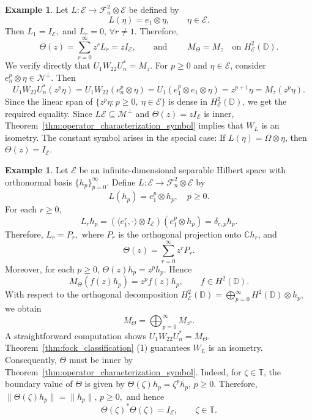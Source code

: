 \documentclass[12pt]{amsart}
\theoremstyle{definition}
\newtheorem{example}[theorem]{Example}
\theoremstyle{remark}
\def \D{\mathbb{D}}
\def \C{\mathbb{C}}
\def \T{\mathbb{T}}
\newcommand{\cle}{\mathcal{E}}
\newcommand{\clm}{\mathcal{M}}
\newcommand{\cln}{\mathcal{N}}
\newcommand{\clf}{\mathcal{F}}
\numberwithin{equation}{section}
\begin{document}
\begin{example} \label{ex:toeplitz symbol is M_z}
Let
$L:\cle\to \clf_n^2\otimes \cle$ be defined by
\[
L(\eta)=e_1\otimes \eta,
\qquad \eta\in \cle.
\]
Then 
$L_1 = I_\cle,$ and $L_r = 0, \, \forall r \neq 1.$ 
Therefore,
\[
\Theta(z)
=
\sum_{r=0}^{\infty} z^r L_r
=
z I_{\cle},
\qquad
\text{and }
\qquad
M_{\Theta}=M_z
\quad \text{on } H^2_{\cle}(\D).
\]
We verify directly that $U_1 W_{22} U_n^*=M_{z}.$ For $p \geq 0$ and $\eta \in \cle$, consider $e_n^{p} \otimes \eta \in \cln^\perp$. Then 
\[
U_1 W_{22} U_n^*(z^p \eta) = U_1 W_{22} (e_n^{p} \otimes \eta) = U_1 (e_1^{p} \otimes e_1 \otimes \eta) = z^{p+1} \eta=M_z (z^p \eta).
\]
Since the linear span of \(\{z^p\eta:p\geq0,\ \eta\in\cle\}\) is dense in $H^2_\cle(\D)$,
we get the required equality. Since \(L\cle\subseteq\clm^\perp\) and \(\Theta(z)=zI_\cle\) is inner,
Theorem~\ref{thm:operator_characterization_symbol} implies that \(W_L\) is an
isometry.
The constant symbol arises in the special case: If $L(\eta)=\Omega\otimes\eta$, then $\Theta(z)=I_\cle.$
\end{example}

\begin{example}
Let $\cle$ be an infinite-dimensional separable Hilbert space with orthonormal basis
$\{h_p\}_{p=0}^\infty$.
Define $L:\cle\to \clf_n^2\otimes \cle$ by
\[
L(h_p)=e_1^{ p}\otimes h_p,
\quad p\ge 0.
\]
For each $r\ge 0$, 
\[
L_r h_p
=
(\langle e_1^{r},\cdot\rangle\otimes I_{\cle})
(e_1^{p}\otimes h_p)
=
\delta_{r,p}h_p.
\]
Therefore, $ L_r=P_r,$
where $P_r$ is the orthogonal projection onto $\C h_r$, and $$\Theta(z)=\sum_{r=0}^\infty z^rP_r.$$
Moreover, for each $p\ge 0$, $\Theta(z)h_p=z^p h_p.$
Hence
\[
M_\Theta(f(z)h_p)=z^p f(z)h_p,
\qquad f\in H^2(\D).
\]
With respect to the orthogonal decomposition $H^2_{\cle}(\D)=\displaystyle\bigoplus_{p=0}^\infty H^2(\D)\otimes h_p,$
we obtain
\[
M_\Theta=\bigoplus_{p=0}^\infty M_{z^p}.
\]
A straightforward computation shows $U_1 W_{22} U_n^*=M_{\Theta}.$ 
Theorem~\ref{thm:fock_classification} (1) guarantees $W_L$ is an isometry. Consequently, $\Theta$ must be inner by Theorem~\ref{thm:operator_characterization_symbol}. Indeed, for
\(\zeta\in\T\), the boundary value of \(\Theta\) is given by $\Theta(\zeta)h_p=\zeta^p h_p,
\, p\geq 0.$
Therefore, $\|\Theta(\zeta)h_p\|=\|h_p\|,
\, p\geq 0,$
and hence 
\[
\Theta(\zeta)^*\Theta(\zeta)=I_{\cle},
\qquad \zeta\in\T.
\]
\end{example}
\end{document}
